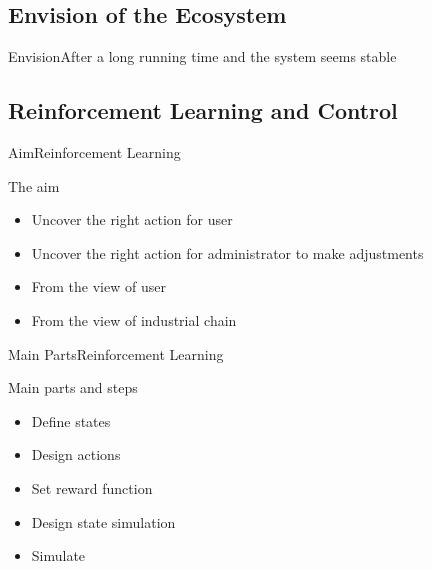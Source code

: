 \subsection{Envision of the Ecosystem}
\begin{frame}{Envision}{After a long running time and the system seems stable}
\end{frame}

\subsection{Reinforcement Learning and Control} %
\label{sub:reinforcement_learning_and_control}
\begin{frame}{Aim}{Reinforcement Learning}
\begin{block}{The aim}
\begin{itemize}
	\item Uncover the right action for user
	\item Uncover the right action for administrator to make adjustments
	\item From the view of user
	\item From the view of industrial chain
\end{itemize}
\end{block}
\end{frame}

\begin{frame}{Main Parts}{Reinforcement Learning}
\begin{block}{Main parts and steps}
\begin{itemize}
	\item Define states
	\item Design actions
	\item Set reward function
	\item Design state simulation
	\item Simulate
\end{itemize}
\end{block}
\end{frame}
